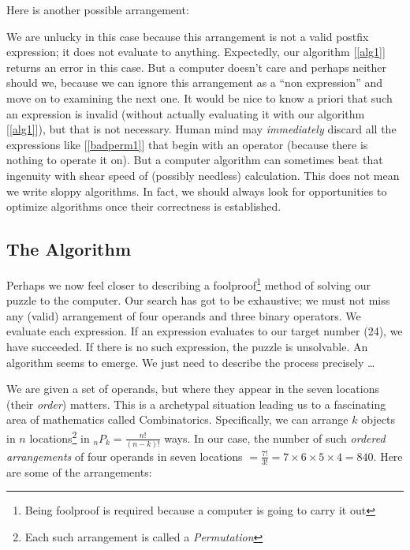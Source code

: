 \documentclass[english,smartquotes]{hgbarticle}
\newenvironment{arrangement}{\captionsetup{type=mytype}}{}
\begin{document}
Here is another possible arrangement:

\begin{arrangement}
\vspace{2mm}
\centering
{}
\label{badperm1}
\end{arrangement}

We are unlucky in this case because this arrangement is not a valid postfix expression; it does not evaluate to anything. Expectedly, our algorithm [\ref{alg1}] returns an error in this case. But a computer doesn't care and perhaps neither should we, because we can ignore this arrangement as a ``non expression'' and move on to examining the next one. It would be nice to know a priori that such an expression is invalid (without actually evaluating it with our algorithm [\ref{alg1}]), but that is not necessary. Human mind may \emph{immediately} discard all the expressions like [\ref{badperm1}] that begin with an operator (because there is nothing to operate it on). But a computer algorithm can sometimes beat that ingenuity with shear speed of (possibly needless) calculation. This does not mean we write sloppy algorithms. In fact, we should always look for opportunities to optimize algorithms once their correctness is established.

\subsection{The Algorithm}
Perhaps we now feel closer to describing a foolproof\footnote{Being foolproof is required because a computer is going to carry it out} method of solving our puzzle to the computer. Our search has got to be exhaustive; we must not miss any (valid) arrangement of four operands and three binary operators. We evaluate each expression. If an expression evaluates to our target number (24), we have succeeded. If there is no such expression, the puzzle is unsolvable. An algorithm seems to emerge. We just need to describe the process precisely \dots

We are given a set of operands, but where they appear in the seven locations (their \emph{order}) matters. This is a archetypal situation leading us to a fascinating area of mathematics called Combinatorics. Specifically, we can arrange $k$ objects in $n$ locations\footnote{Each such arrangement is called a \emph{Permutation}} in ${}_{n}P_{k} = \frac{n!}{(n-k)!}$ ways. In our case, the number of such \emph{ordered arrangements} of four operands in seven locations $=\frac{7!}{3!}=7\times 6\times 5\times 4 = 840$. Here are some of the arrangements:
\end{document}
